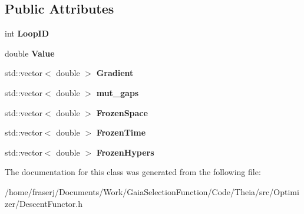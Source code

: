 \subsection*{Public Attributes}
\begin{DoxyCompactItemize}
\item 
\mbox{\label{classDescentFunctor_a14a7ae0eb78ad3a56a289ee300119104}} 
int {\bfseries Loop\+ID}
\item 
\mbox{\label{classDescentFunctor_a09bd6f8a2558a7530486ae0605f44983}} 
double {\bfseries Value}
\item 
\mbox{\label{classDescentFunctor_acb32f6b34a3eb2d0ebf170a674ab1c02}} 
std\+::vector$<$ double $>$ {\bfseries Gradient}
\item 
\mbox{\label{classDescentFunctor_a424da8de442d996ae9062bbedbcd7868}} 
std\+::vector$<$ double $>$ {\bfseries mut\+\_\+gaps}
\item 
\mbox{\label{classDescentFunctor_a80f4fb498c367c3bf9752163cb13f8f5}} 
std\+::vector$<$ double $>$ {\bfseries Frozen\+Space}
\item 
\mbox{\label{classDescentFunctor_a2bddad96900bc85af34e773c092c257f}} 
std\+::vector$<$ double $>$ {\bfseries Frozen\+Time}
\item 
\mbox{\label{classDescentFunctor_a8d0f68c56e365aa9d2a6804ea2627de8}} 
std\+::vector$<$ double $>$ {\bfseries Frozen\+Hypers}
\end{DoxyCompactItemize}


The documentation for this class was generated from the following file\+:\begin{DoxyCompactItemize}
\item 
/home/fraserj/\+Documents/\+Work/\+Gaia\+Selection\+Function/\+Code/\+Theia/src/\+Optimizer/Descent\+Functor.\+h\end{DoxyCompactItemize}

